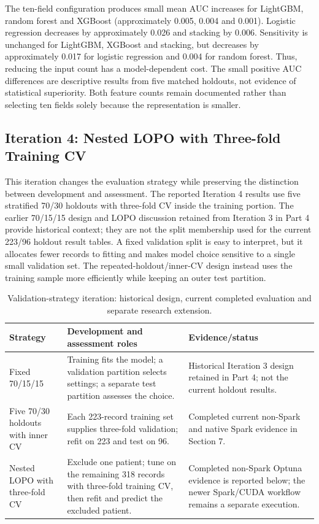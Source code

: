 

The ten-field configuration produces small mean AUC increases for LightGBM, random forest and XGBoost (approximately 0.005, 0.004 and 0.001). Logistic regression decreases by approximately 0.026 and stacking by 0.006. Sensitivity is unchanged for LightGBM, XGBoost and stacking, but decreases by approximately 0.017 for logistic regression and 0.004 for random forest. Thus, reducing the input count has a model-dependent cost. The small positive AUC differences are descriptive results from five matched holdouts, not evidence of statistical superiority. Both feature counts remain documented rather than selecting ten fields solely because the representation is smaller.

\subsection{Iteration 4: Nested LOPO with Three-fold Training CV}
\label{subsec:validation-strategy-iteration}
This iteration changes the evaluation strategy while preserving the distinction between development and assessment. The reported Iteration 4 results use five stratified 70/30 holdouts with three-fold CV inside the training portion. The earlier 70/15/15 design and LOPO discussion retained from Iteration 3 in Part 4 provide historical context; they are not the split membership used for the current 223/96 holdout result tables. A fixed validation split is easy to interpret, but it allocates fewer records to fitting and makes model choice sensitive to a single small validation set. The repeated-holdout/inner-CV design instead uses the training sample more efficiently while keeping an outer test partition.

\begin{table}[H]
\centering\small
\caption{Validation-strategy iteration: historical design, current completed evaluation and separate research extension.}
\label{tab:validation-strategy-iteration}
\begin{tabularx}{\textwidth}{@{}p{2.6cm}XX@{}}
\toprule
Strategy & Development and assessment roles & Evidence/status \\
\midrule
Fixed 70/15/15 & Training fits the model; a validation partition selects settings; a separate test partition assesses the choice. & Historical Iteration 3 design retained in Part 4; not the current holdout results. \\
Five 70/30 holdouts with inner CV & Each 223-record training set supplies three-fold validation; refit on 223 and test on 96. & Completed current non-Spark and native Spark evidence in Section 7. \\
Nested LOPO with three-fold CV & Exclude one patient; tune on the remaining 318 records with three-fold training CV, then refit and predict the excluded patient. & Completed non-Spark Optuna evidence is reported below; the newer Spark/CUDA workflow remains a separate execution. \\
\bottomrule
\end{tabularx}
\end{table}

